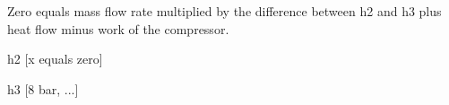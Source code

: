 Zero equals mass flow rate multiplied by the difference between h2 and h3 plus heat flow minus work of the compressor.  

h2 [x equals zero]  

h3 [8 bar, ...]